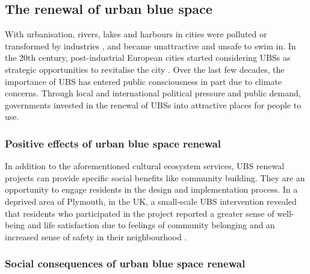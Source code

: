 \documentclass{article}
\begin{document}
\subsection{The renewal of urban blue space}

With urbanisation, rivers, lakes and harbours in cities were polluted or transformed by industries \parencite{kampa_langaas_anzaldua_2016}, and became unattractive and unsafe to swim in.
In the 20th century, post-industrial European cities started considering UBSs as strategic opportunities to revitalise the city \parencite{del2021dismantling}. Over the last few decades, the importance of UBS has entered public consciousness in part due to climate concerns.
Through local and international political pressure and public demand, governments invested in the renewal of UBSs into attractive places for people to use. %

\subsubsection{Positive effects of urban blue space renewal}

In addition to the aforementioned cultural ecosystem services, UBS renewal projects can provide specific social benefits like community building. They are an opportunity to engage residents in the design and implementation process. In a deprived area of Plymouth, in the UK, a small-scale UBS intervention revealed that residents who participated in the project reported a greater sense of well-being and life satisfaction due to feelings of community belonging and an increased sense of safety in their neighbourhood \parencite{van2021urban}.


\subsubsection{Social consequences of urban blue space renewal}
\end{document}
